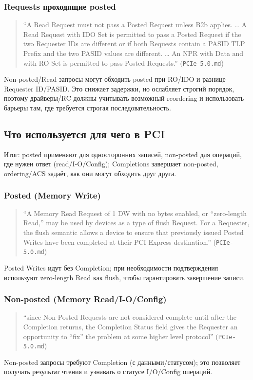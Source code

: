 \documentclass[a4paper,12pt]{article}
\begin{document}
\subsubsection{Requests проходящие posted}
\begin{quote}
``A Read Request must not pass a Posted Request unless B2b applies. … A Read Request with IDO Set is permitted to pass a Posted Request if the two Requester IDs are different or if both Requests contain a PASID TLP Prefix and the two PASID values are different. … An NPR with Data and with RO Set is permitted to pass Posted Requests.'' (\texttt{PCIe-5.0.md})
\end{quote}
Non-posted/Read запросы могут обходить posted при RO/IDO и разнице Requester ID/PASID. Это снижает задержки, но ослабляет строгий порядок, поэтому драйверы/RC должны учитывать возможный reordering и использовать барьеры там, где требуется строгая последовательность.
\subsection{Что используется для чего в PCI}
Итог: posted применяют для односторонних записей, non-posted для операций, где нужен ответ (read/I-O/Config); Completions завершает non-posted, ordering/ACS задаёт, как они могут обходить друг друга.
\subsubsection{Posted (Memory Write)}
\begin{quote}
``A Memory Read Request of 1 DW with no bytes enabled, or “zero-length Read,” may be used by devices as a type of flush Request. For a Requester, the flush semantic allows a device to ensure that previously issued Posted Writes have been completed at their PCI Express destination.'' (\texttt{PCIe-5.0.md})
\end{quote}
Posted Writes идут без Completion; при необходимости подтверждения используют zero-length Read как flush, чтобы гарантировать завершение записи.

\subsubsection{Non-posted (Memory Read/I-O/Config)}
\begin{quote}
``since Non-Posted Requests are not considered complete until after the Completion returns, the Completion Status field gives the Requester an opportunity to “fix” the problem at some higher level protocol'' (\texttt{PCIe-5.0.md})
\end{quote}
Non-posted запросы требуют Completion (с данными/статусом); это позволяет получать результат чтения и узнавать о статусе I/O/Config операций.
\end{document}
